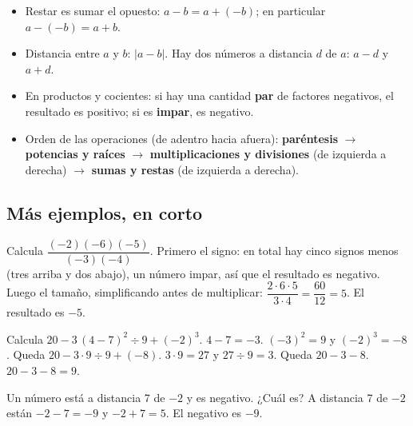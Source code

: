 
\ejemplosdibujados

\begin{regla}
\begin{itemize}
  \item Restar es sumar el opuesto: $a - b = a + (-b)$; en particular $a - (-b) = a + b$.
  \item Distancia entre $a$ y $b$: $|a - b|$. Hay dos números a distancia $d$ de $a$: $a - d$ y $a + d$.
  \item En productos y cocientes: si hay una cantidad \textbf{par} de factores negativos, el resultado es positivo; si es
  \textbf{impar}, es negativo.
  \item Orden de las operaciones (de adentro hacia afuera): \textbf{paréntesis} $\to$ \textbf{potencias y raíces}
  $\to$ \textbf{multiplicaciones y divisiones} (de izquierda a derecha) $\to$ \textbf{sumas y restas} (de izquierda a
  derecha).
\end{itemize}
\end{regla}

\subsection{Más ejemplos, en corto}
\begin{ejemplo}
Calcula $\dfrac{(-2)(-6)(-5)}{(-3)(-4)}$.
\solucion Primero el signo: en total hay cinco signos menos (tres arriba y dos abajo), un número impar, así que el
resultado es negativo. Luego el tamaño, simplificando antes de multiplicar: $\dfrac{2 \cdot 6 \cdot 5}{3 \cdot 4} =
\dfrac{60}{12} = 5$. El resultado es $-5$.
\end{ejemplo}

\begin{ejemplo}
Calcula $20 - 3\,(4 - 7)^2 \div 9 + (-2)^3$.
\solucion
{} $4 - 7 = -3$.
 $(-3)^2 = 9$ y $(-2)^3 = -8$. Queda $20 - 3 \cdot 9 \div 9 + (-8)$.
 $3 \cdot 9 = 27$ y $27 \div 9 = 3$. Queda $20 - 3 - 8$.
 $20 - 3 - 8 = 9$.
\end{ejemplo}

\begin{ejemplo}
Un número está a distancia 7 de $-2$ y es negativo. ¿Cuál es?
\solucion A distancia 7 de $-2$ están $-2 - 7 = -9$ y $-2 + 7 = 5$. El negativo es $-9$.
\end{ejemplo}

